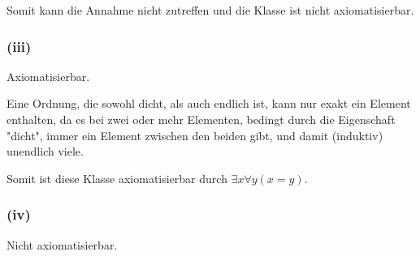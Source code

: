 \documentclass[11pt, a4paper]{article}
\renewcommand{\v}{\vee}
\newcommand{\n}{\wedge}
\begin{document}
Somit kann die Annahme nicht zutreffen und die Klasse ist nicht axiomatisierbar.

\subsubsection*{(iii)}
Axiomatisierbar.


Eine Ordnung, die sowohl dicht, als auch endlich ist, kann nur exakt ein Element enthalten, da es bei zwei oder mehr Elementen, bedingt durch die Eigenschaft "dicht", immer ein Element zwischen den beiden gibt, und damit (induktiv) unendlich viele.

Somit ist diese Klasse axiomatisierbar durch $\exists x \forall y ( x = y )$.

\subsubsection*{(iv)}
Nicht axiomatisierbar.

\end{document}
